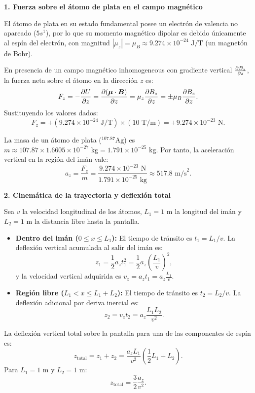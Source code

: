 \begin{resolucion}
\textbf{1. Fuerza sobre el átomo de plata en el campo magnético}

El átomo de plata en su estado fundamental posee un electrón de valencia no apareado ($5s^1$), por lo que su momento magnético dipolar es debido únicamente al espín del electrón, con magnitud $|\mu_z| = \mu_B \approx 9.274 \times 10^{-24}\text{ J/T}$ (un magnetón de Bohr).

En presencia de un campo magnético inhomogeneous con gradiente vertical $\frac{\partial B_z}{\partial z}$, la fuerza neta sobre el átomo en la dirección $z$ es:
\[
F_z = -\frac{\partial U}{\partial z} = \frac{\partial (\bm{\mu} \cdot \bm{B})}{\partial z} = \mu_z \frac{\partial B_z}{\partial z} = \pm \mu_B \frac{\partial B_z}{\partial z}.
\]
Sustituyendo los valores dados:
\[
F_z = \pm (9.274 \times 10^{-24}\text{ J/T}) \times (10\text{ T/m}) = \pm 9.274 \times 10^{-23}\text{ N}.
\]

La masa de un átomo de plata ($^{107.87}\text{Ag}$) es $m \approx 107.87 \times 1.6605 \times 10^{-27}\text{ kg} = 1.791 \times 10^{-25}\text{ kg}$. Por tanto, la aceleración vertical en la región del imán vale:
\[
a_z = \frac{F_z}{m} = \frac{9.274 \times 10^{-23}\text{ N}}{1.791 \times 10^{-25}\text{ kg}} \approx 517.8\text{ m/s}^2.
\]

\textbf{2. Cinemática de la trayectoria y deflexión total}

Sea $v$ la velocidad longitudinal de los átomos, $L_1 = 1\text{ m}$ la longitud del imán y $L_2 = 1\text{ m}$ la distancia libre hasta la pantalla.

\begin{itemize}
  \item \textbf{Dentro del imán ($0 \le x \le L_1$):} El tiempo de tránsito es $t_1 = L_1 / v$. La deflexión vertical acumulada al salir del imán es:
  \[
  z_1 = \frac{1}{2} a_z t_1^2 = \frac{1}{2} a_z \left(\frac{L_1}{v}\right)^2,
  \]
  y la velocidad vertical adquirida es $v_z = a_z t_1 = a_z \frac{L_1}{v}$.

  \item \textbf{Región libre ($L_1 < x \le L_1 + L_2$):} El tiempo de tránsito es $t_2 = L_2 / v$. La deflexión adicional por deriva inercial es:
  \[
  z_2 = v_z t_2 = a_z \frac{L_1 L_2}{v^2}.
  \]
\end{itemize}

La deflexión vertical total sobre la pantalla para una de las componentes de espín es:
\[
z_{\text{total}} = z_1 + z_2 = \frac{a_z L_1}{v^2} \left( \frac{1}{2} L_1 + L_2 \right).
\]
Para $L_1 = 1\text{ m}$ y $L_2 = 1\text{ m}$:
\[
z_{\text{total}} = \frac{3}{2} \frac{a_z}{v^2}.
\]


\end{resolucion}
